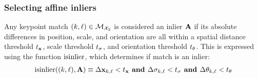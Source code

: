         \subsubsection{Selecting affine inliers}
            Any keypoint match $(k, \ell) \in
              \mathcal{M}_{\mathcal{X}_{2}}$  is considered an inlier \wrt{}
              $\mathbf{A}$ if its absolute differences in position, scale,
              and orientation are all within a spatial distance threshold
              $t_{\mathbf{x}}$, scale threshold $t_{{\sigma}}$, and
              orientation threshold $t_{{\theta}}$.
            This is expressed using the function $\operatorname{isinlier}$, which
              determines if match is an inlier:
            \begin{equation}\label{eqn:inlierchecks}
                \begin{gathered}
                    \operatorname{isinlier}((k, \ell), \mathbf{A})  \equiv  
                        \Delta \mathbf{x}_{k, \ell} < t_{\mathbf{x}} \textbf{ and } 
                        \Delta \sigma_{k, \ell} < t_{{\sigma}} \textbf{ and } 
                        \Delta \theta_{k, \ell} < t_{{\theta}}
                \end{gathered}
            \end{equation}
